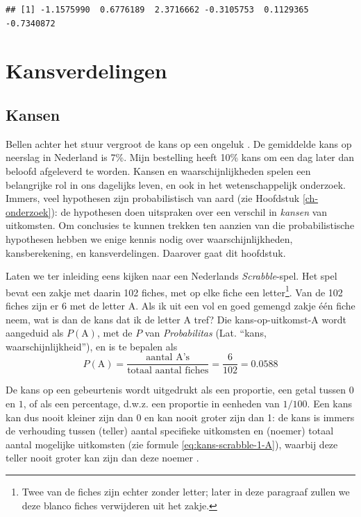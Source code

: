 \documentclass[
]{book}
\begin{document}
\begin{verbatim}
## [1] -1.1575990  0.6776189  2.3716662 -0.3105753  0.1129365 -0.7340872
\end{verbatim}

\chapter{Kansverdelingen}\label{ch-kansverdelingen}

\section{Kansen}\label{sec:kansen}

Bellen achter het stuur vergroot de kans op een ongeluk \citep{Bhar13}. De
gemiddelde kans op neerslag in Nederland is 7\%. Mijn bestelling heeft
10\% kans om een dag later dan beloofd afgeleverd te worden. Kansen en
waarschijnlijkheden spelen een belangrijke rol in ons dagelijks leven,
en ook in het wetenschappelijk onderzoek. Immers, veel hypothesen zijn
probabilistisch van aard (zie Hoofdstuk \ref{ch-onderzoek}):
de hypothesen doen uitspraken over
een verschil in \emph{kansen} van uitkomsten. Om conclusies te kunnen trekken
ten aanzien van die probabilistische hypothesen hebben we enige kennis
nodig over waarschijnlijkheden, kansberekening, en kansverdelingen.
Daarover gaat dit hoofdstuk.

Laten we ter inleiding eens kijken naar een Nederlands \emph{Scrabble}-spel.
Het spel bevat een zakje met daarin 102 fiches, met op elke fiche een
letter\footnote{Twee van de fiches zijn echter zonder letter; later in deze paragraaf zullen we deze blanco fiches verwijderen uit het zakje.}. Van de 102 fiches zijn er 6 met de letter A. Als ik uit een
vol en goed gemengd zakje één fiche neem, wat is dan de kans dat ik de
letter A tref? Die kans-op-uitkomst-A wordt aangeduid als
\(P(\textrm{A})\), met de \(P\) van \emph{Probabilitas} (Lat. ``kans,
waarschijnlijkheid''), en is te bepalen als
\begin{equation}
    P(\textrm{A})=
    \frac{\textrm{aantal A's}}{\textrm{totaal aantal fiches}}= 
    \frac{6}{102} = 0.0588
  \label{eq:kans-scrabble-1-A}
\end{equation}

De kans op een gebeurtenis wordt uitgedrukt als een proportie, een getal
tussen \(0\) en \(1\), of als een percentage, d.w.z. een proportie in
eenheden van \(1/100\). Een kans kan dus nooit kleiner zijn dan \(0\) en kan
nooit groter zijn dan 1: de kans is immers de verhouding tussen (teller)
aantal specifieke uitkomsten en (noemer) totaal aantal mogelijke
uitkomsten (zie
formule \eqref{eq:kans-scrabble-1-A}), waarbij deze teller nooit groter kan
zijn dan deze noemer \citep{SK01}.
\end{document}
